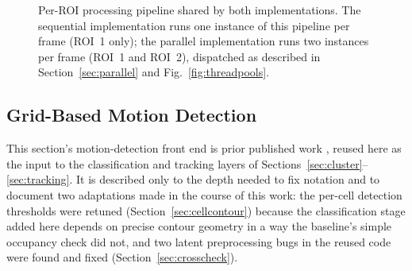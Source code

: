 \documentclass[conference]{IEEEtran}
\begin{document}
\begin{figure}[t]
\centering
{}
\caption{Per-ROI processing pipeline shared by both implementations.
The sequential implementation runs one instance of this pipeline per
frame (ROI~1 only); the parallel implementation runs two instances per
frame (ROI~1 and ROI~2), dispatched as described in
Section~\ref{sec:parallel} and Fig.~\ref{fig:threadpools}.}
\label{fig:pipeline}
\end{figure}

\subsection{Grid-Based Motion Detection}
\label{sec:motion}

This section's motion-detection front end is prior published work
\cite{baseline}, reused here as the input to the classification and
tracking layers of Sections~\ref{sec:cluster}--\ref{sec:tracking}. It is
described only to the depth needed to fix notation and to document two
adaptations made in the course of this work: the per-cell detection
thresholds were retuned (Section~\ref{sec:cellcontour}) because the
classification stage added here depends on precise contour geometry in
a way the baseline's simple occupancy check did not, and two latent
preprocessing bugs in the reused code were found and fixed
(Section~\ref{sec:crosscheck}).
\end{document}

